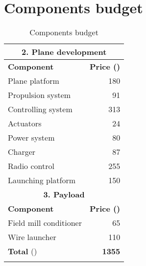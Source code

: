 \section{Components budget}
\begin{longtable}[htb]{@{}lr@{}}\toprule[3pt]
	\multicolumn{2}{c}{\textbf{\large 2. Plane development} }\\ \midrule[2pt]
	\textbf{Component} &\textbf{Price (\officialeuro)}\\ \midrule[1pt]

	Plane platform& 180\\
	Propulsion system& 91\\
	Controlling system& 313\\
	Actuators&24\\
	Power system &80\\
	Charger & 87\\
	Radio control&255\\
	Launching platform&150\\
	\midrule[2pt]
	\multicolumn{2}{c}{\textbf{\large 3. Payload} }\\ \midrule[2pt]
	\textbf{Component} &\textbf{Price (\officialeuro)}\\ \midrule[1pt] 
	Field mill conditioner&65\\
	Wire launcher&110\\
	\midrule[2pt]
	\Large \textbf{Total} \small(\officialeuro)& \textbf{1355}\\
	\bottomrule[3pt]
	\caption{Components budget}
\end{longtable}
